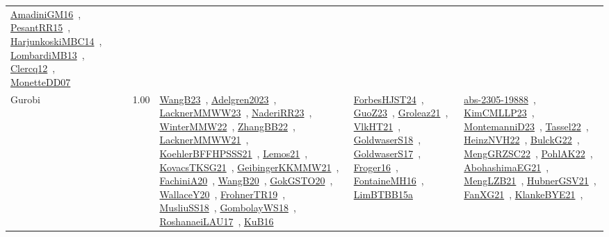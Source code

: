 {\begin{longtable}{p{3cm}r>{\raggedright\arraybackslash}p{6cm}>{\raggedright\arraybackslash}p{6cm}>{\raggedright\arraybackslash}p{8cm}}
\href{../works/AmadiniGM16.pdf}{AmadiniGM16}~\cite{AmadiniGM16}, \href{../works/PesantRR15.pdf}{PesantRR15}~\cite{PesantRR15}, \href{../works/HarjunkoskiMBC14.pdf}{HarjunkoskiMBC14}~\cite{HarjunkoskiMBC14}, \href{../works/LombardiMB13.pdf}{LombardiMB13}~\cite{LombardiMB13}, \href{../works/Clercq12.pdf}{Clercq12}~\cite{Clercq12}, \href{../works/MonetteDD07.pdf}{MonetteDD07}~\cite{MonetteDD07}\\
\index{Gurobi}\index{CPSystems!Gurobi}Gurobi &  1.00 & \href{../works/WangB23.pdf}{WangB23}~\cite{WangB23}, \href{../works/Adelgren2023.pdf}{Adelgren2023}~\cite{Adelgren2023}, \href{../works/LacknerMMWW23.pdf}{LacknerMMWW23}~\cite{LacknerMMWW23}, \href{../works/NaderiRR23.pdf}{NaderiRR23}~\cite{NaderiRR23}, \href{../works/WinterMMW22.pdf}{WinterMMW22}~\cite{WinterMMW22}, \href{../works/ZhangBB22.pdf}{ZhangBB22}~\cite{ZhangBB22}, \href{../works/LacknerMMWW21.pdf}{LacknerMMWW21}~\cite{LacknerMMWW21}, \href{../works/KoehlerBFFHPSSS21.pdf}{KoehlerBFFHPSSS21}~\cite{KoehlerBFFHPSSS21}, \href{../works/Lemos21.pdf}{Lemos21}~\cite{Lemos21}, \href{../works/KovacsTKSG21.pdf}{KovacsTKSG21}~\cite{KovacsTKSG21}, \href{../works/GeibingerKKMMW21.pdf}{GeibingerKKMMW21}~\cite{GeibingerKKMMW21}, \href{../works/FachiniA20.pdf}{FachiniA20}~\cite{FachiniA20}, \href{../works/WangB20.pdf}{WangB20}~\cite{WangB20}, \href{../works/GokGSTO20.pdf}{GokGSTO20}~\cite{GokGSTO20}, \href{../works/WallaceY20.pdf}{WallaceY20}~\cite{WallaceY20}, \href{../works/FrohnerTR19.pdf}{FrohnerTR19}~\cite{FrohnerTR19}, \href{../works/MusliuSS18.pdf}{MusliuSS18}~\cite{MusliuSS18}, \href{../works/GombolayWS18.pdf}{GombolayWS18}~\cite{GombolayWS18}, \href{../works/RoshanaeiLAU17.pdf}{RoshanaeiLAU17}~\cite{RoshanaeiLAU17}, \href{../works/KuB16.pdf}{KuB16}~\cite{KuB16} & \href{../works/ForbesHJST24.pdf}{ForbesHJST24}~\cite{ForbesHJST24}, \href{../works/GuoZ23.pdf}{GuoZ23}~\cite{GuoZ23}, \href{../works/Groleaz21.pdf}{Groleaz21}~\cite{Groleaz21}, \href{../works/VlkHT21.pdf}{VlkHT21}~\cite{VlkHT21}, \href{../works/GoldwaserS18.pdf}{GoldwaserS18}~\cite{GoldwaserS18}, \href{../works/GoldwaserS17.pdf}{GoldwaserS17}~\cite{GoldwaserS17}, \href{../works/Froger16.pdf}{Froger16}~\cite{Froger16}, \href{../works/FontaineMH16.pdf}{FontaineMH16}~\cite{FontaineMH16}, \href{../works/LimBTBB15a.pdf}{LimBTBB15a}~\cite{LimBTBB15a} & \href{../works/abs-2305-19888.pdf}{abs-2305-19888}~\cite{abs-2305-19888}, \href{../works/KimCMLLP23.pdf}{KimCMLLP23}~\cite{KimCMLLP23}, \href{../works/MontemanniD23.pdf}{MontemanniD23}~\cite{MontemanniD23}, \href{../works/Tassel22.pdf}{Tassel22}~\cite{Tassel22}, \href{../works/HeinzNVH22.pdf}{HeinzNVH22}~\cite{HeinzNVH22}, \href{../works/BulckG22.pdf}{BulckG22}~\cite{BulckG22}, \href{../works/MengGRZSC22.pdf}{MengGRZSC22}~\cite{MengGRZSC22}, \href{../works/PohlAK22.pdf}{PohlAK22}~\cite{PohlAK22}, \href{../works/AbohashimaEG21.pdf}{AbohashimaEG21}~\cite{AbohashimaEG21}, \href{../works/MengLZB21.pdf}{MengLZB21}~\cite{MengLZB21}, \href{../works/HubnerGSV21.pdf}{HubnerGSV21}~\cite{HubnerGSV21}, \href{../works/FanXG21.pdf}{FanXG21}~\cite{FanXG21}, \href{../works/KlankeBYE21.pdf}{KlankeBYE21}~\cite{KlankeBYE21}, 
\end{longtable}}
